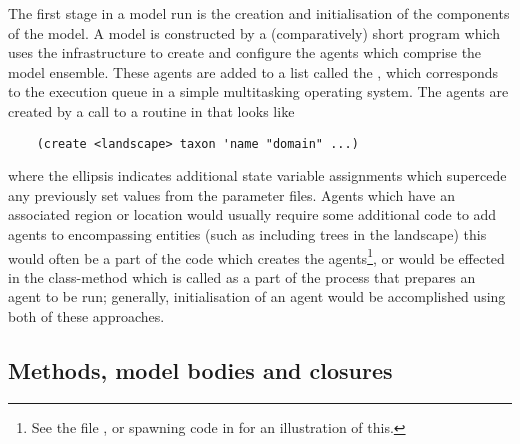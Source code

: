 The first stage in a model run is the creation and initialisation of the
components of the model. A model is constructed by a (comparatively)
short \Scheme program which uses the infrastructure to create
and configure the agents which comprise the model ensemble.  These
agents are added to a list called the , which
corresponds to the execution queue in a simple multitasking operating
system. The agents are created by a call to a routine in
 that looks like
\begin{verbatim}
    (create <landscape> taxon 'name "domain" ...)
\end{verbatim}
where the ellipsis indicates additional state variable
assignments which supercede any previously set values from the
parameter files. Agents which have an associated region or location
would usually require some additional code to add agents to
encompassing entities (such as including trees in the landscape) this
would often be a part of the code which creates the
agents\footnote{See the file , or spawning
  code in  for an illustration of this.},
or would be effected in the class-method 
which is called as a part of the process that prepares an agent to be
run; generally, initialisation of an agent would be accomplished using
both of these approaches.


\subsection{Methods, model bodies and closures}

